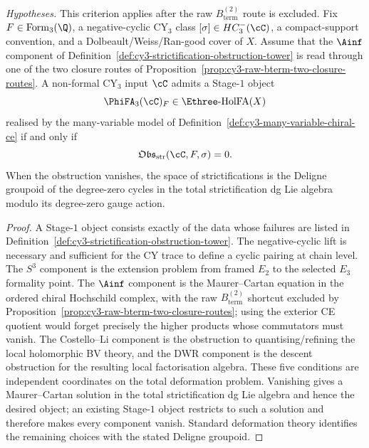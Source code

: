 \begin{theorem}
\label{thm:cy3-strictification-criterion}
\noindent\emph{Hypotheses.} This criterion applies after the raw
$B_{\mathrm{term}}^{(2)}$ route is excluded.
Fix $F\in\mathrm{Form}_3(\Q)$, a negative-cyclic CY$_3$ class
$[\sigma]\in HC^{-}_3(\cC)$, a compact-support convention, and a
Dolbeault/Weiss/Ran-good cover of $X$. Assume that the $\Ainf$ component
of Definition~\ref{def:cy3-strictification-obstruction-tower} is read
through one of the two closure routes of
Proposition~\ref{prop:cy3-raw-bterm-two-closure-routes}. A non-formal
CY$_3$ input
$\cC$ admits a Stage-$1$ object
\[
 \PhiFA_3(\cC)_F\in\Ethree\text{-}\mathrm{HolFA}(X)
\]
realised by the many-variable model of
Definition~\ref{def:cy3-many-variable-chiral-ce} if and only if
\[
 \mathfrak{Obs}_{\mathrm{str}}(\cC,F,\sigma)=0.
\]
When the obstruction vanishes, the space of strictifications is the
Deligne groupoid of the degree-zero cycles in the total strictification
dg Lie algebra modulo its degree-zero gauge action.
\end{theorem}

\begin{proof}
A Stage-$1$ object consists exactly of the data whose failures are
listed in Definition~\ref{def:cy3-strictification-obstruction-tower}.
The negative-cyclic lift is necessary and sufficient for the CY trace to
define a cyclic pairing at chain level. The $S^3$ component is the
extension problem from framed $E_2$ to the selected $E_3$ formality
point. The $\Ainf$ component is the Maurer--Cartan equation in the
ordered chiral Hochschild complex, with the raw
$B_{\mathrm{term}}^{(2)}$ shortcut excluded by
Proposition~\ref{prop:cy3-raw-bterm-two-closure-routes}; using the
exterior CE quotient would forget precisely the higher products whose
commutators must vanish.
The Costello--Li component is the obstruction to quantising/refining the
local holomorphic BV theory, and the DWR component is the descent
obstruction for the resulting local factorisation algebra. These five
conditions are independent coordinates on the total deformation
problem. Vanishing gives a Maurer--Cartan solution in the total
strictification dg Lie algebra and hence the desired object; an existing
Stage-$1$ object restricts to such a solution and therefore makes every
component vanish. Standard deformation theory identifies the remaining
choices with the stated Deligne groupoid.
\end{proof}

